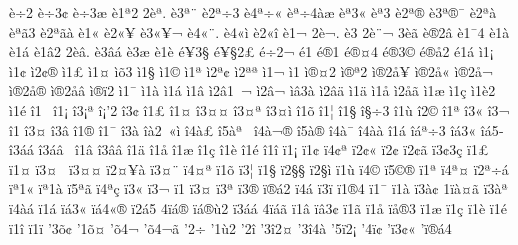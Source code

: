 {^^e8^^f72
^^e8^^f73^^a2
^^e8^^f73^^ad^^e6
^^e81^^aa2
2^^e8^^aa.
^^e83^^aa^^a8
^^e82^^aa^^f73
^^e84^^aa^^f7^^ab
^^e8^^aa^^f74^^e0^^e6
^^e8^^aa3^^ab
^^e8^^aa3^^ad
^^e82^^aa^^ae
^^e83^^aa^^ae^^af
^^e82^^aa^^e0
^^e8^^aa^^e33
^^e82^^aa^^e3^^e0
^^e81^^ab
^^e82^^ab^^a5
^^e83^^ab^^a5^^ac
^^e84^^ab^^a8.
^^e84^^ab^^ec
^^e82^^ab^^ee
^^e81^^ac
2^^e8^^ac.
^^e83^^ad
2^^e8^^ad^^a8^^ac
3^^e8^^ad^^e3
^^e8^^ae2^^e2
^^e81^^af4
^^e81^^e0
^^e81^^e1
^^e81^^e22
2^^e8^^e2.
^^e83^^e2^^e1
^^e83^^e6
^^e81^^e8
^^e9^^a53^^a7
^^e9^^a5^^a72^^a3
^^e9^^f72^^ac
^^e91^^ad
^^e9^^ae1
^^e9^^ae^^a44
^^e9^^ae3^^a9
^^e9^^ae^^e52
^^e91^^e1
^^ec1^^a1
^^ec1^^a2
^^ec2^^a2^^ae
^^ec1^^a3
^^ec1^^a4
^^ec^^f53
^^ec1^^a7
^^ec1^^a9
^^ec1^^aa
^^ec2^^aa^^a2
^^ec2^^aa^^aa
^^ec1^^ac
^^ec1^^ad
^^ec^^ae^^a42
^^ec^^ae^^aa2
^^ec^^ae2^^e5^^a5
^^ec^^ae2^^e5^^ab
^^ec^^ae2^^e5^^ac
^^ec^^ae2^^e5^^ae
^^ec^^ae2^^e5^^e2
^^ec^^ae^^ef2
^^ec1^^af
^^ec1^^e0
^^ec1^^e1
^^ec1^^e2
^^ec2^^e21^^a0^^ac
^^ec2^^e2^^ac
^^ec^^e23^^e0
^^ec2^^e2^^e4
^^ec1^^e4
^^ec1^^e5
^^ec2^^e5^^e3
^^ec1^^e6
^^ec1^^e7
^^ec1^^e82
^^ec1^^e9
^^ee1^^a0
^^ee1^^a1
^^ee3^^a1^^aa
^^ee^^a1'2
^^ee3^^a2
^^ee1^^a3
^^ee1^^a4
^^ee3^^a4^^a4
^^ee3^^a4^^aa
^^ee3^^a4^^ec
^^ee1^^f5
^^ee1^^a6
^^ee1^^a7
^^ee^^a7^^f73
^^ee1^^f9
^^ee2^^a9
^^ee1^^aa
^^ee3^^ab
^^ee3^^ac
^^ee1^^ad
^^ee3^^ad^^a4
^^ee3^^ad^^e2
^^ee1^^ae
^^ee1^^af
^^ee3^^e0
^^ee^^e02^^a0^^ab^^ec
^^ee4^^e0^^a3
^^ee5^^e0^^aa^^a0
^^ee4^^e0^^ac^^ae
^^ee5^^e0^^ae
^^ee4^^e0^^af
^^ee4^^e0^^e0
^^ee1^^e1
^^ee^^e1^^aa^^f73
^^ee^^e13^^ab
^^ee^^e15^^ad
^^ee3^^e1^^e1
^^ee3^^e1^^e2^^a0
^^ee1^^e2
^^ee3^^e2^^e2
^^ee1^^e4
^^ee1^^e5
^^ee1^^e6
^^ee1^^e7
^^ee1^^e8
^^ee1^^e9
^^ee1^^ee
^^ef1^^a1
^^ef1^^a2
^^ef4^^a2^^aa
^^ef2^^a2^^ab
^^ef2^^a2^^ad
^^ef2^^a2^^e3
^^ef3^^a23^^e7
^^ef1^^a3
^^ef1^^a4
^^ef3^^a4^^a0
^^ef3^^a4^^a4
^^ef2^^a4^^a5^^e0
^^ef3^^a4^^a8
^^ef4^^a4^^aa
^^ef1^^f5
^^ef3^^a6
^^ef1^^a7
^^ef2^^a7^^a7
^^ef2^^a7^^ec
^^ef1^^f9
^^ef4^^a9
^^ef5^^a9^^ae
^^ef1^^aa
^^ef4^^aa^^a4
^^ef2^^aa^^f7^^e1
^^ef^^aa1^^ab
^^ef^^aa1^^e0
^^ef5^^aa^^e3
^^ef4^^aa^^e7
^^ef3^^ab
^^ef3^^ac
^^ef1^^ad
^^ef3^^ad^^a4
^^ef3^^ad^^aa
^^ef3^^ad^^ae
^^ef^^ad^^ae^^e12
^^ef4^^ad^^e1
^^ef3^^ad^^ef
^^ef1^^ae4
^^ef1^^af
^^ef1^^e0
^^ef3^^e0^^a2
1^^ef^^e0^^a4^^e3
^^ef3^^e0^^aa
^^ef4^^e0^^e1
^^ef1^^e1
^^ef^^e13^^ab
^^ef^^e14^^ab^^ae
^^ef2^^e15^^ad
4^^ef^^e1^^ae
^^ef^^e1^^ae^^f92
^^ef3^^e1^^e1
4^^ef^^e1^^e3
^^ef1^^e2
^^ef^^e23^^a2
^^ef1^^e3
^^ef1^^e5
^^ef^^e5^^ae3
^^ef1^^e6
^^ef1^^e7
^^ef1^^e8
^^ef1^^e9
^^ef1^^ee
^^ef1^^ef
'3^^f5^^a2
'1^^f5^^a4
'^^f54^^ac^^ad
'^^f54^^ac^^e3
'2^^f7
'1^^f92
'2^^ee
'3^^ee2^^a4
'3^^ee4^^e0
'5^^ef2^^a1
'4^^ef^^a2
'^^ef3^^a2^^ab
'^^ef^^ad^^ae^^e14
}
